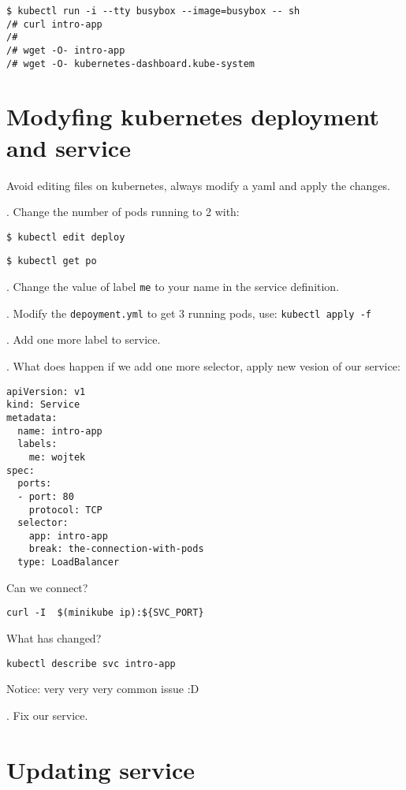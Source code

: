 \documentclass[12pt, letterpaper]{article}
\begin{document}
\begin{verbatim}
$ kubectl run -i --tty busybox --image=busybox -- sh
/# curl intro-app
/#
/# wget -O- intro-app
/# wget -O- kubernetes-dashboard.kube-system
\end{verbatim}

%
%
%
\section{Modyfing kubernetes deployment and service}

Avoid editing files on kubernetes, always modify a yaml and apply the changes.

. Change the number of pods running to 2 with:

\begin{verbatim}
$ kubectl edit deploy
\end{verbatim}

\begin{verbatim}
$ kubectl get po
\end{verbatim}

. Change the value of label \verb|me| to your name in the service definition.

. Modify the \verb|depoyment.yml| to get 3 running pods, use: \texttt{kubectl apply -f}

. Add one more label to service.

. What does happen if we add one more selector, apply new vesion of our service:

\begin{verbatim}
apiVersion: v1
kind: Service
metadata:
  name: intro-app
  labels:
    me: wojtek
spec:
  ports:
  - port: 80
    protocol: TCP
  selector:
    app: intro-app
    break: the-connection-with-pods
  type: LoadBalancer
\end{verbatim}

Can we connect?

\begin{verbatim}
curl -I  $(minikube ip):${SVC_PORT}
\end{verbatim}

What has changed?
\begin{verbatim}
kubectl describe svc intro-app
\end{verbatim}

\bigskip
Notice: {\large very very very common issue} :D

. Fix our service.

%
%
%
\section{Updating service}
\end{document}
